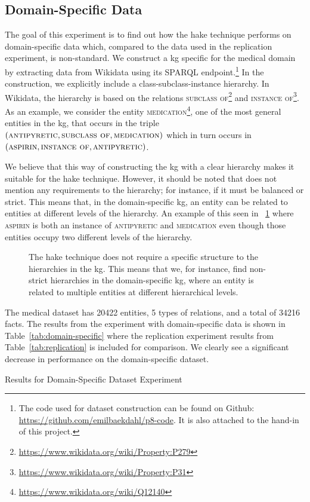 \subsection{Domain-Specific Data}\label{sec:domain-specific}

The goal of this experiment is to find out how the \ac{hake} technique performs on domain-specific data which, compared to the data used in the replication experiment, is non-standard.
We construct a \ac{kg} specific for the medical domain by extracting data from Wikidata using its SPARQL endpoint.\footnote{The code used for dataset construction can be found on Github: \url{https://github.com/emilbaekdahl/p8-code}. It is also attached to the hand-in of this project.}
In the construction, we explicitly include a class-subclass-instance hierarchy.
In Wikidata, the hierarchy is based on the relations \textsc{subclass of}\footnote{\url{https://www.wikidata.org/wiki/Property:P279}} and \textsc{instance of}\footnote{\url{https://www.wikidata.org/wiki/Property:P31}}.
As an example, we consider the entity \textsc{medication}\footnote{\url{https://www.wikidata.org/wiki/Q12140}}, one of the most general entities in the \ac{kg}, that occurs in the triple $(\textsc{antipyretic}, \textsc{subclass of}, \textsc{medication})$ which in turn occurs in $(\textsc{aspirin}, \textsc{instance of}, \textsc{antipyretic})$.

We believe that this way of constructing the \ac{kg} with a clear hierarchy makes it suitable for the \ac{hake} technique.
However, it should be noted that\cite{Zhang2019} does not mention any requirements to the hierarchy; for instance, if it must be balanced or strict.
This means that, in the domain-specific \ac{kg}, an entity can be related to entities at different levels of the hierarchy.
An example of this seen in \figurename~\ref{fig:non-strict-hierarchy} where \textsc{aspirin} is both an instance of \textsc{antipyretic} and \textsc{medication} even though those entities occupy two different levels of the hierarchy.

\begin{figure}[ht]
  \centering\small
  
  \caption{%
    The \ac{hake} technique does not require a specific structure to the hierarchies in the \ac{kg}.
    This means that we, for instance, find non-strict hierarchies in the domain-specific \ac{kg}, where an entity is related to multiple entities at different hierarchical levels.
  }\label{fig:non-strict-hierarchy}
\end{figure}

The medical dataset has \num{20422} entities, \num{5} types of relations, and a total of \num{34216} facts.
The results from the experiment with domain-specific data is shown in Table~\ref{tab:domain-specific} where the replication experiment results from Table~\ref{tab:replication} is included for comparison.
We clearly see a significant decrease in performance on the domain-specific dataset.

\begin{table}[ht]
  \centering
  \caption{Results for Domain-Specific Dataset Experiment}\label{tab:domain-specific}
  
\end{table}
